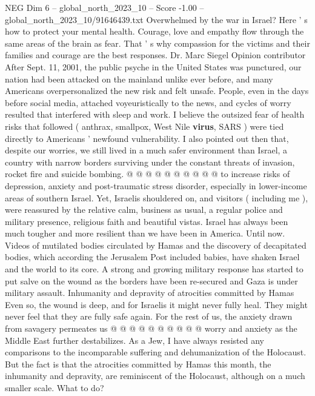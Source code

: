 \begin{textsample}{NEG Dim 6 – global\_north\_2023\_10 – Score -1.00 – global\_north\_2023\_10/91646439.txt}  \label{ex:f6_neg_253}
Overwhelmed by the war in Israel?
Here ' s how to protect your mental health.
Courage, love and empathy flow through the same areas of the brain as fear.
That ' s why compassion for the victims and their families and courage are the best responses.
Dr.
Marc Siegel Opinion contributor After Sept. 11, 2001, the public psyche in the United States was punctured, our nation had been attacked on the mainland unlike ever before, and many Americans overpersonalized the new risk and felt unsafe.
People, even in the days before social media, attached voyeuristically to the news, and cycles of worry resulted that interfered with sleep and work.
I believe the outsized fear of health risks that followed ( anthrax, smallpox, West Nile \textbf{virus}, SARS ) were tied directly to Americans ' newfound vulnerability.
I also pointed out then that, despite our worries, we still lived in a much safer environment than Israel, a country with narrow borders surviving under the constant threats of invasion, rocket fire and suicide bombing. @ @ @ @ @ @ @ @ @ @ to increase risks of depression, anxiety and post-traumatic stress disorder, especially in lower-income areas of southern Israel.
Yet, Israelis shouldered on, and visitors ( including me ), were reassured by the relative calm, business as usual, a regular police and military presence, religious faith and beautiful vistas.
Israel has always been much tougher and more resilient than we have been in America.
Until now.
Videos of mutilated bodies circulated by Hamas and the discovery of decapitated bodies, which according the Jerusalem Post included babies, have shaken Israel and the world to its core.
A strong and growing military response has started to put salve on the wound as the borders have been re-secured and Gaza is under military assault.
Inhumanity and depravity of atrocities committed by Hamas Even so, the wound is deep, and for Israelis it might never fully heal.
They might never feel that they are fully safe again.
For the rest of us, the anxiety drawn from savagery permeates us @ @ @ @ @ @ @ @ @ @ worry and anxiety as the Middle East further destabilizes.
As a Jew, I have always resisted any comparisons to the incomparable suffering and dehumanization of the Holocaust.
But the fact is that the atrocities committed by Hamas this month, the inhumanity and depravity, are reminiscent of the Holocaust, although on a much smaller scale.
What to do?

\end{textsample}
